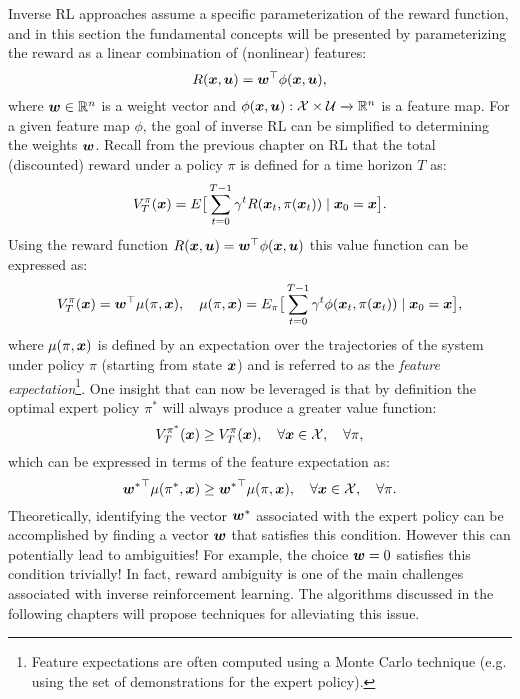 Inverse RL approaches assume a specific parameterization of the reward function, and in this section the fundamental concepts will be presented by parameterizing the reward as a linear combination of (nonlinear) features:
\begin{equation*}
R(\bm{x}, \bm{u}) = \bm{w}^\top  \phi(\bm{x}, \bm{u}),
\end{equation*}
where $\bm{w} \in \mathbb{R}^n$ is a weight vector and $\phi(\bm{x}, \bm{u}): \mathcal{X} \times \mathcal{U} \xrightarrow{} \mathbb{R}^n$ is a feature map. For a given feature map $\phi$, the goal of inverse RL can be simplified to determining the weights $\bm{w}$.
Recall from the previous chapter on RL that the total (discounted) reward under a policy $\pi$ is defined for a time horizon $T$ as:
\begin{equation*}
V_T^\pi(\bm{x}) = E\big[\sum_{t=0}^{T-1} \gamma^tR(\bm{x}_t, \pi(\bm{x}_t)) \mid \bm{x}_0 = \bm{x} \big].
\end{equation*}
Using the reward function $R(\bm{x}, \bm{u}) = \bm{w}^\top  \phi(\bm{x}, \bm{u})$ this value function can be expressed as:
\begin{equation*}
V_T^\pi(\bm{x}) = \bm{w}^\top  \mu(\pi, \bm{x}), \quad \mu(\pi, \bm{x}) = E_{\pi}\big[\sum_{t=0}^{T-1} \gamma^t \phi(\bm{x}_t, \pi(\bm{x}_t)) \mid \bm{x}_0 = \bm{x} \big],
\end{equation*}
where $\mu(\pi, \bm{x})$ is defined by an expectation over the trajectories of the system under policy $\pi$ (starting from state $\bm{x}$) and is referred to as the \textit{feature expectation}\footnote{Feature expectations are often computed using a Monte Carlo technique (e.g. using the set of demonstrations for the expert policy).}. One insight that can now be leveraged is that by definition the optimal expert policy $\pi^*$ will always produce a greater value function:
\begin{equation*}
    V_T^{\pi^*}(\bm{x}) \geq V_T^\pi(\bm{x}), \quad \forall \bm{x} \in \mathcal{X}, \quad \forall \pi,
\end{equation*}
which can be expressed in terms of the feature expectation as:
\begin{equation} \label{eq:irlcondition}
 {\bm{w}^*}^\top  \mu(\pi^*, \bm{x}) \geq  {\bm{w}^*}^\top  \mu(\pi, \bm{x}), \quad \forall \bm{x} \in \mathcal{X}, \quad \forall \pi.
\end{equation}
Theoretically, identifying the vector $\bm{w}^*$ associated with the expert policy can be accomplished by finding a vector $\bm{w}$ that satisfies this condition. 
However this can potentially lead to ambiguities! For example, the choice $\bm{w} = 0$ satisfies this condition trivially!
In fact, reward ambiguity is one of the main challenges associated with inverse reinforcement learning\cite{NgRussell2000}. The algorithms discussed in the following chapters will propose techniques for alleviating this issue.

